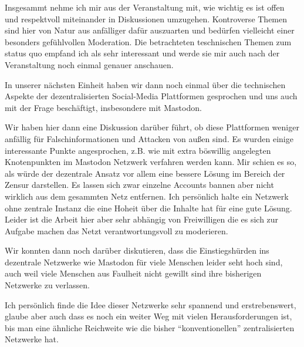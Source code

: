 \documentclass[12pt]{article}
\begin{document}
\vspace{1em}

Insgesammt nehme ich mir aus der Veranstaltung mit, wie wichtig es ist offen und respektvoll miteinander in Diskussionen umzugehen. Kontroverse Themen sind hier von Natur aus anfälliger dafür auszuarten und bedürfen vielleicht einer besonders gefühlvollen Moderation.
Die betrachteten teschnischen Themen zum status quo empfand ich als sehr interessant und werde sie mir auch nach der Veranstaltung noch einmal genauer anschauen.

\vspace{1em}

In unserer nächsten Einheit haben wir dann noch einmal über die technischen Aspekte der dezentralisierten Social-Media Plattformen gesprochen und uns auch mit der Frage beschäftigt, insbesondere mit Mastodon.

\vspace{1em}

Wir haben hier dann eine Diskussion darüber führt, ob diese Plattformen weniger anfällig für Falschinformationen und Attacken von außen sind. Es wurden einige interessante Punkte angesprochen, z.B. wie mit extra böswillig angelegten Knotenpunkten im Mastodon Netzwerk verfahren werden kann.
Mir schien es so, als würde der dezentrale Ansatz vor allem eine bessere Lösung im Bereich der Zensur darstellen. Es lassen sich zwar einzelne Accounts bannen aber nicht wirklich aus dem gesammten Netz entfernen. 
Ich persönlich halte ein Netzwerk ohne zentrale Instanz die eine Hoheit über die Inhalte hat für eine gute Lösung. Leider ist die Arbeit hier aber sehr abhängig von Freiwilligen die es sich zur Aufgabe machen das Netzt verantwortungsvoll zu moderieren.

\vspace{1em}

Wir konnten dann noch darüber diskutieren, dass die Einstiegshürden ins dezentrale Netzwerke wie Mastodon für viele Menschen leider seht hoch sind, auch weil viele Menschen aus Faulheit nicht gewillt sind ihre bisherigen Netzwerke zu verlassen.

\vspace{1em}

Ich persönlich finde die Idee dieser Netzwerke sehr spannend und erstrebenswert, glaube aber auch dass es noch ein weiter Weg mit vielen Herausforderungen ist, bis man eine ähnliche Reichweite wie die bisher ``konventionellen'' zentralisierten Netzwerke hat.

\vspace{1em}
\end{document}
